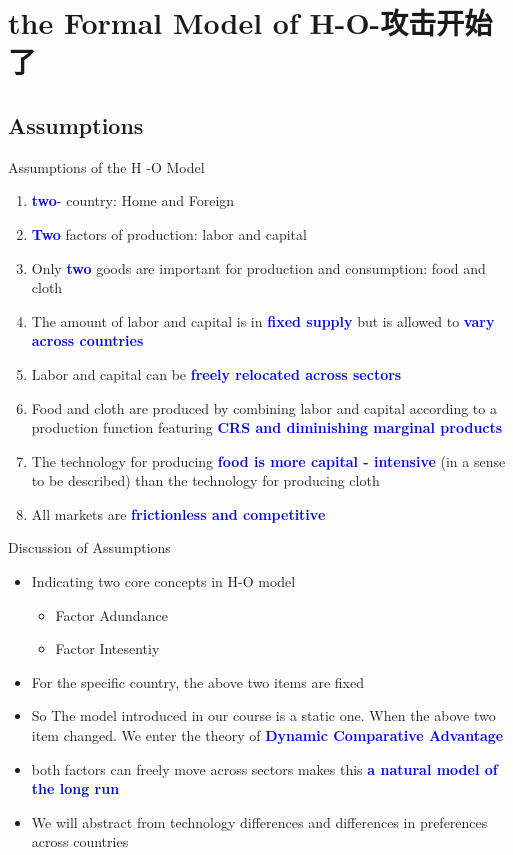 \documentclass[10pt,hyperref={CJKbookmarks=true},xcolor=dvipsnames,aspectratio=169]{beamer}
\begin{document}
\section{the Formal Model of H-O-攻击开始了}


\subsection{Assumptions}
\begin{frame}{Assumptions of the H -O Model }

\begin{enumerate}
\item \textbf{\textcolor{blue}{two}}- country: Home and Foreign 
\item \textbf{\textcolor{blue}{Two}} factors of production: labor and capital 
\item Only \textbf{\textcolor{blue}{two}} goods are important for production
and consumption: food and cloth 
\item The amount of labor and capital is in \textbf{\textcolor{blue}{fixed
supply}} but is allowed to \textbf{\textcolor{blue}{vary across countries }}
\item Labor and capital can be \textbf{\textcolor{blue}{freely relocated
across sectors}} 
\item Food and cloth are produced by combining labor and capital according
to a production function featuring \textbf{\textcolor{blue}{CRS and
diminishing marginal products }}
\item The technology for producing \textbf{\textcolor{blue}{food is more
capital - intensive}} (in a sense to be described) than the technology
for producing cloth 
\item All markets are \textbf{\textcolor{blue}{frictionless and competitive}} 
\end{enumerate}
\end{frame}

\begin{frame}{Discussion of Assumptions }

\begin{itemize}
\item Indicating two core concepts in H-O model

\begin{itemize}
\item Factor Adundance
\item Factor Intesentiy
\end{itemize}
\item For the specific country, the above two items are fixed
\item So The model introduced in our course is a static one. When the above
two item changed. We enter the theory of \textbf{\textcolor{blue}{Dynamic
Comparative Advantage}}
\item both factors can freely move across sectors makes this \textbf{\textcolor{blue}{a
natural model of the long run}}
\item We will abstract from technology differences and differences in preferences
across countries
\end{itemize}
\end{frame}
\end{document}
